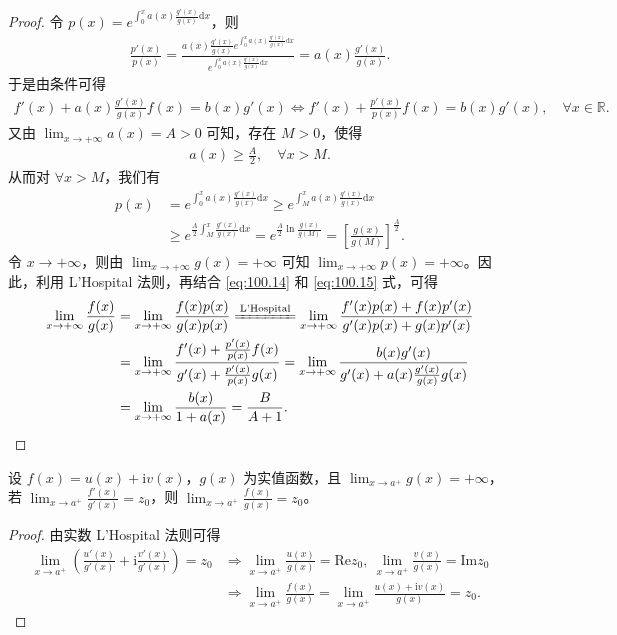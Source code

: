 \documentclass[../../main.tex]{subfiles}%
\begin{document}
\begin{proof}
令 \(p(x) = e^{\int_0^x a(x) \frac{g'(x)}{g(x)} \mathrm{d}x}\)，则
\begin{align}
\frac{p'(x)}{p(x)} = \frac{a(x) \frac{g'(x)}{g(x)} e^{\int_0^x a(x) \frac{g'(x)}{g(x)} \mathrm{d}x}}{e^{\int_0^x a(x) \frac{g'(x)}{g(x)} \mathrm{d}x}} = a(x) \frac{g'(x)}{g(x)}. \label{eq:100.14}
\end{align}
于是由条件可得
\begin{align}
f'(x) + a(x) \frac{g'(x)}{g(x)} f(x) = b(x) g'(x) \Longleftrightarrow f'(x) + \frac{p'(x)}{p(x)} f(x) = b(x) g'(x), \quad \forall x \in \mathbb{R}. \label{eq:100.15}
\end{align}
又由 \(\lim_{x \to +\infty} a(x) = A > 0\) 可知，存在 \(M > 0\)，使得
\begin{align*}
a(x) \geqslant \frac{A}{2}, \quad \forall x > M.
\end{align*}
从而对 \(\forall x > M\)，我们有
\begin{align*}
p(x) &= e^{\int_0^x a(x) \frac{g'(x)}{g(x)} \mathrm{d}x} \geqslant e^{\int_M^x a(x) \frac{g'(x)}{g(x)} \mathrm{d}x} \\
&\geqslant e^{\frac{A}{2} \int_M^x \frac{g'(x)}{g(x)} \mathrm{d}x} = e^{\frac{A}{2} \ln \frac{g(x)}{g(M)}} = \left[ \frac{g(x)}{g(M)} \right]^{\frac{A}{2}}.
\end{align*}
令 \(x \to +\infty\)，则由 \(\lim_{x \to +\infty} g(x) = +\infty\) 可知 \(\lim_{x \to +\infty} p(x) = +\infty\)。因此，利用 L'Hospital 法则，再结合 \eqref{eq:100.14} 和 \eqref{eq:100.15} 式，可得
\begin{align*}
\lim_{x \to +\infty} \frac{f(x)}{g(x)} &= \lim_{x \to +\infty} \frac{f(x) p(x)}{g(x) p(x)} \xlongequal{\text{L'Hospital}} \lim_{x \to +\infty} \frac{f'(x) p(x) + f(x) p'(x)}{g'(x) p(x) + g(x) p'(x)} \\
&= \lim_{x \to +\infty} \frac{f'(x) + \frac{p'(x)}{p(x)} f(x)}{g'(x) + \frac{p'(x)}{p(x)} g(x)} = \lim_{x \to +\infty} \frac{b(x) g'(x)}{g'(x) + a(x) \frac{g'(x)}{g(x)} g(x)} \\
&= \lim_{x \to +\infty} \frac{b(x)}{1 + a(x)} = \frac{B}{A + 1}.
\end{align*}
\end{proof}

\begin{proposition}\label{proposition:L'Hospital法则(复变函数版本)}
设 \( f(x) = u(x) + \mathrm{i} v(x) \)，\( g(x) \) 为实值函数，且 \( \lim_{x \to a^+} g(x) = +\infty \)，若 \( \lim_{x \to a^+} \frac{f'(x)}{g'(x)} = z_0 \)，则 \( \lim_{x \to a^+} \frac{f(x)}{g(x)} = z_0 \)。
\end{proposition}
\begin{proof}
由实数 L’Hospital 法则可得
\begin{align*}
\lim_{x \to a^+} \left( \frac{u'(x)}{g'(x)} + \mathrm{i} \frac{v'(x)}{g'(x)} \right) = z_0 &\Rightarrow \lim_{x \to a^+} \frac{u(x)}{g(x)} = \mathrm{Re} z_0,\ \lim_{x \to a^+} \frac{v(x)}{g(x)} = \mathrm{Im} z_0 \\
&\Rightarrow \lim_{x \to a^+} \frac{f(x)}{g(x)} = \lim_{x \to a^+} \frac{u(x) + \mathrm{i} v(x)}{g(x)} = z_0.
\end{align*} 
\end{proof}
\end{document}
